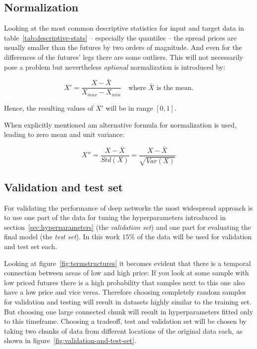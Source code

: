 \subsection{Normalization}

Looking at the most common descriptive statistics for input and target data in table~\ref{tab:descriptive-stats} -- especially the quantiles -- the spread prices are usually smaller than the futures by two orders of magnitude. And even for the differences of the futures' legs there are some outliers. This will not necessarily pose a problem but nevertheless \emph{optional} normalization is introduced by:

\begin{equation}
	X' = \frac{X - \bar{X}}{X_{max} - X_{min}} \quad \text{where $\bar{X}$ is the mean.}
\end{equation}

Hence, the resulting values of $X'$ will be in range $[0,1]$.

When explicitly mentioned am alternative formula for normalization is used, leading to zero mean and unit variance:

\begin{equation}
	\label{eq:normalization2}
	X'' = \frac{X - \bar{X}}{Std(X)} = \frac{X - \bar{X}}{\sqrt{Var(X)}}
\end{equation}

\subsection{Validation and test set}
\label{sec:aao-validation-and-test-set}

For validating the performance of deep networks the most widespread approach is to use one part of the data for tuning the hyperparameters introduced in section~\ref{sec:hyperparameters} (the \emph{validation set}) and one part for evaluating the final model (the \emph{test set}). In this work $15\%$ of the data will be used for validation and test set each. 

Looking at figure~\ref{fig:termstructures} it becomes evident that there is a temporal connection between areas of low and high price: If you look at some sample with low priced futures there is a high probability that samples next to this one also have a low price and vice versa. Therefore choosing completely random samples for validation and testing will result in datasets highly similar to the training set. But choosing one large connected chunk will result in hyperparameters fitted only to this timeframe. Choosing a tradeoff, test and validation set will be chosen by taking two chunks of data from different locations of the original data each, as shown in figure~\ref{fig:validation-and-test-set}.

